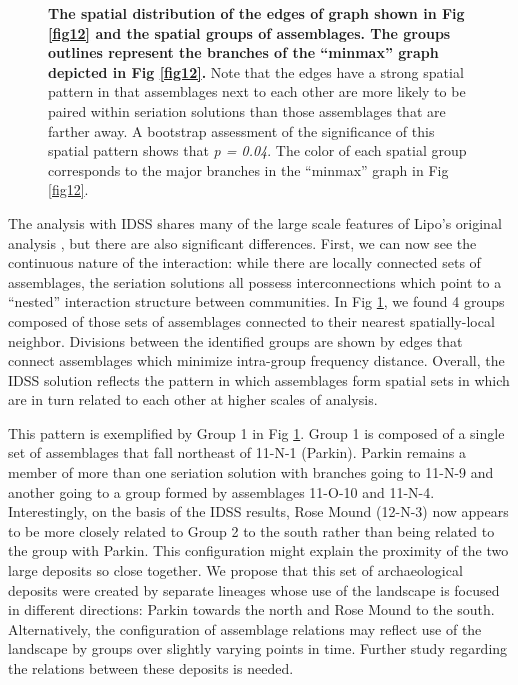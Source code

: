 \documentclass[10pt,letterpaper]{article}
\begin{document}
\begin{figure}[h]
\caption{{\bf The spatial distribution of the edges of graph shown in Fig \ref{fig12} and the spatial groups of assemblages. The groups outlines represent the branches of the ``minmax'' graph depicted in Fig \ref{fig12}.} Note that the edges have a strong spatial pattern in that assemblages next to each other are more likely to be paired within seriation solutions than those assemblages that are farther away. A bootstrap assessment of the significance of this spatial pattern shows that \emph{p = 0.04}. The color of each spatial group corresponds to the major branches in the ``minmax'' graph in Fig \ref{fig12}.}
\label{fig13}
\end{figure}

The analysis with IDSS shares many of the large scale features of Lipo's original analysis \cite{Lipo2001a}, but there are also significant differences. First, we can now see the continuous nature of the interaction: while there are locally connected sets of assemblages, the seriation solutions all possess interconnections which point to a ``nested'' interaction structure between communities. In Fig \ref{fig13}, we found 4 groups composed of those sets of assemblages connected to their nearest spatially-local neighbor. Divisions between the identified groups are shown by edges that connect assemblages which minimize intra-group frequency distance. Overall, the IDSS solution reflects the pattern in which assemblages form spatial sets in which are in turn related to each other at higher scales of analysis.

This pattern is exemplified by Group 1 in Fig \ref{fig13}. Group 1 is composed of a single set of assemblages that fall northeast of 11-N-1 (Parkin). Parkin remains a member of more than one seriation solution with branches going to 11-N-9 and another going to a group formed by assemblages 11-O-10 and 11-N-4. Interestingly, on the basis of the IDSS results, Rose Mound (12-N-3) now appears to be more closely related to Group 2 to the south rather than being related to the group with Parkin. This configuration might explain the proximity of the two large deposits so close together. We propose that this set of archaeological deposits were created by separate lineages whose use of the landscape is focused in different directions: Parkin towards the north and Rose Mound to the south. Alternatively, the configuration of assemblage relations may reflect use of the landscape by groups over slightly varying points in time. Further study regarding the relations between these deposits is needed.
\end{document}

